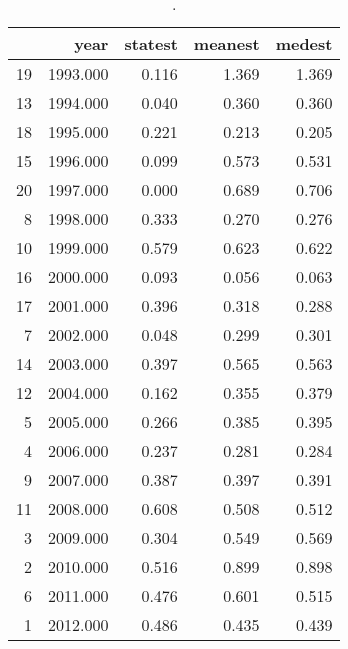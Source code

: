 \begin{table}[ht]
\centering
\begin{tabular}{rrrrr}
  \hline
 & year & statest & meanest & medest \\ 
  \hline
19 & 1993.000 & 0.116 & 1.369 & 1.369 \\ 
  13 & 1994.000 & 0.040 & 0.360 & 0.360 \\ 
  18 & 1995.000 & 0.221 & 0.213 & 0.205 \\ 
  15 & 1996.000 & 0.099 & 0.573 & 0.531 \\ 
  20 & 1997.000 & 0.000 & 0.689 & 0.706 \\ 
  8 & 1998.000 & 0.333 & 0.270 & 0.276 \\ 
  10 & 1999.000 & 0.579 & 0.623 & 0.622 \\ 
  16 & 2000.000 & 0.093 & 0.056 & 0.063 \\ 
  17 & 2001.000 & 0.396 & 0.318 & 0.288 \\ 
  7 & 2002.000 & 0.048 & 0.299 & 0.301 \\ 
  14 & 2003.000 & 0.397 & 0.565 & 0.563 \\ 
  12 & 2004.000 & 0.162 & 0.355 & 0.379 \\ 
  5 & 2005.000 & 0.266 & 0.385 & 0.395 \\ 
  4 & 2006.000 & 0.237 & 0.281 & 0.284 \\ 
  9 & 2007.000 & 0.387 & 0.397 & 0.391 \\ 
  11 & 2008.000 & 0.608 & 0.508 & 0.512 \\ 
  3 & 2009.000 & 0.304 & 0.549 & 0.569 \\ 
  2 & 2010.000 & 0.516 & 0.899 & 0.898 \\ 
  6 & 2011.000 & 0.476 & 0.601 & 0.515 \\ 
  1 & 2012.000 & 0.486 & 0.435 & 0.439 \\ 
   \hline
\end{tabular}
\caption{.} 
\label{spe-by-year-table-fy1}
\end{table}
